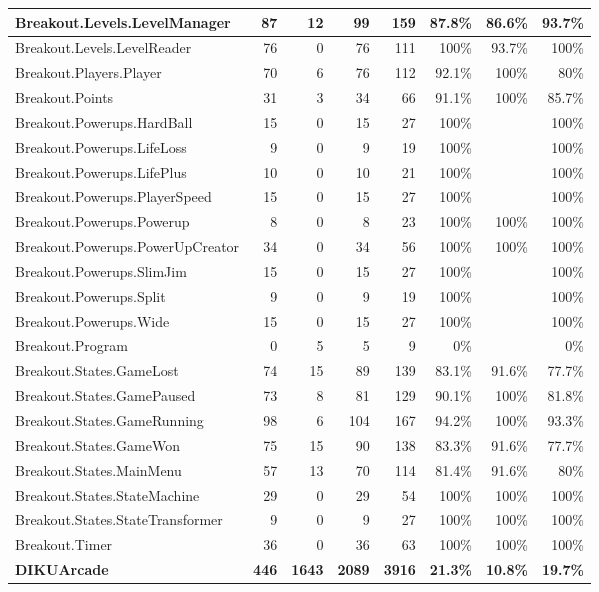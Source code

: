 \documentclass[a4paper,landscape,10pt]{article}
\begin{document}
\begin{longtable}[l]{|l|r|r|r|r|r|r|r|}
\hline
Breakout.Levels.LevelManager & 87 & 12 & 99 & 159 & 87.8\% & 86.6\% & 93.7\%\\
\hline
Breakout.Levels.LevelReader & 76 & 0 & 76 & 111 & 100\% & 93.7\% & 100\%\\
\hline
Breakout.Players.Player & 70 & 6 & 76 & 112 & 92.1\% & 100\% & 80\%\\
\hline
Breakout.Points & 31 & 3 & 34 & 66 & 91.1\% & 100\% & 85.7\%\\
\hline
Breakout.Powerups.HardBall & 15 & 0 & 15 & 27 & 100\% &  & 100\%\\
\hline
Breakout.Powerups.LifeLoss & 9 & 0 & 9 & 19 & 100\% &  & 100\%\\
\hline
Breakout.Powerups.LifePlus & 10 & 0 & 10 & 21 & 100\% &  & 100\%\\
\hline
Breakout.Powerups.PlayerSpeed & 15 & 0 & 15 & 27 & 100\% &  & 100\%\\
\hline
Breakout.Powerups.Powerup & 8 & 0 & 8 & 23 & 100\% & 100\% & 100\%\\
\hline
Breakout.Powerups.PowerUpCreator & 34 & 0 & 34 & 56 & 100\% & 100\% & 100\%\\
\hline
Breakout.Powerups.SlimJim & 15 & 0 & 15 & 27 & 100\% &  & 100\%\\
\hline
Breakout.Powerups.Split & 9 & 0 & 9 & 19 & 100\% &  & 100\%\\
\hline
Breakout.Powerups.Wide & 15 & 0 & 15 & 27 & 100\% &  & 100\%\\
\hline
Breakout.Program & 0 & 5 & 5 & 9 & 0\% &  & 0\%\\
\hline
Breakout.States.GameLost & 74 & 15 & 89 & 139 & 83.1\% & 91.6\% & 77.7\%\\
\hline
Breakout.States.GamePaused & 73 & 8 & 81 & 129 & 90.1\% & 100\% & 81.8\%\\
\hline
Breakout.States.GameRunning & 98 & 6 & 104 & 167 & 94.2\% & 100\% & 93.3\%\\
\hline
Breakout.States.GameWon & 75 & 15 & 90 & 138 & 83.3\% & 91.6\% & 77.7\%\\
\hline
Breakout.States.MainMenu & 57 & 13 & 70 & 114 & 81.4\% & 91.6\% & 80\%\\
\hline
Breakout.States.StateMachine & 29 & 0 & 29 & 54 & 100\% & 100\% & 100\%\\
\hline
Breakout.States.StateTransformer & 9 & 0 & 9 & 27 & 100\% & 100\% & 100\%\\
\hline
Breakout.Timer & 36 & 0 & 36 & 63 & 100\% & 100\% & 100\%\\
\hline
\textbf{DIKUArcade} & \textbf{446} & \textbf{1643} & \textbf{2089} & \textbf{3916} & \textbf{21.3\%} & \textbf{10.8\%} & \textbf{19.7\%}\\

\end{longtable}
\end{document}
